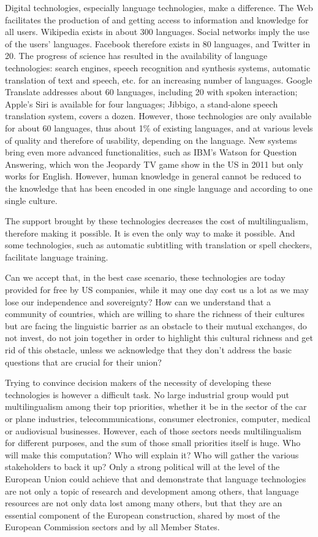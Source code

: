 \begin{multicols}{2}
Digital technologies, especially language technologies, make a difference. The Web facilitates the production of and getting access to information and knowledge for all users. Wikipedia exists in about 300 languages. Social networks imply the use of the users’ languages. Facebook therefore exists in 80 languages, and Twitter in 20. The progress of science has resulted in the availability of language technologies: search engines, speech recognition and synthesis systems, automatic translation of text and speech, etc. for an increasing number of languages. Google Translate addresses about 60 languages, including 20 with spoken interaction; Apple’s Siri is available for four languages; Jibbigo, a stand-alone speech translation system, covers a dozen. However, those technologies are only available for about 60 languages, thus about 1\% of existing languages, and at various levels of quality and therefore of usability, depending on the language. New systems bring even more advanced functionalities, such as IBM’s Watson for Question Answering, which won the Jeopardy TV game show in the US in 2011 but only works for English. However, human knowledge in general cannot be reduced to the knowledge that has been encoded in one single language and according to one single culture.

The support brought by these technologies decreases the cost of multilingualism, therefore making it possible. It is even the only way to make it possible. And some technologies, such as automatic subtitling with translation or spell checkers, facilitate language training.

Can we accept that, in the best case scenario, these technologies are today provided for free by US companies, while it may one day cost us a lot as we may lose our independence and sovereignty? How can we understand that a community of countries, which are willing to share the richness of their cultures but are facing the linguistic barrier as an obstacle to their mutual exchanges, do not invest, do not join together in order to highlight this cultural richness and get rid of this obstacle, unless we acknowledge that they don’t address the basic questions that are crucial for their union?

Trying to convince decision makers of the necessity of developing these technologies is however a difficult task. No large industrial group would put multilingualism among their top priorities, whether it be in the sector of the car or plane industries, telecommunications, consumer electronics, computer, medical or audiovisual businesses. However, each of those sectors needs multilingualism for different purposes, and the sum of those small priorities itself is huge. Who will make this computation? Who will explain it? Who will gather the various stakeholders to back it up? Only a strong political will at the level of the European Union could achieve that and demonstrate that language technologies are not only a topic of research and development among others, that language resources are not only data lost among many others, but that they are an essential component of the European construction, shared by most of the European Commission sectors and by all Member States.


\end{multicols}
